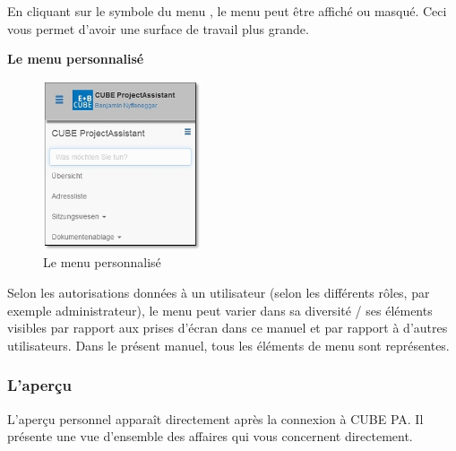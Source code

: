\vspace{\baselineskip}

En cliquant sur le symbole du menu , le menu peut être affiché ou masqué. Ceci vous permet d'avoir une surface de travail plus grande. \\

\vspace{7cm}

\textbf{Le menu personnalisé}

\begin{figure}
\vspace{-35pt}
\includegraphics[height=50mm]{../chapters/01_Einfuehrung/pictures/1-3-1_MenuAngepasst.jpg}
\caption{Le menu personnalisé}
\end{figure}

Selon les autorisations données à un utilisateur (selon les différents rôles, par exemple administrateur), le menu peut varier dans sa diversité / ses éléments visibles par rapport aux prises d'écran dans ce manuel et par rapport à d'autres utilisateurs. Dans le présent manuel, tous les éléments de menu sont représentes.

\subsubsection{L'aperçu}
\label{bkm:Ref132000001}
L'aperçu personnel apparaît directement après la connexion à CUBE PA. Il présente une vue d'ensemble des affaires qui vous concernent directement.

